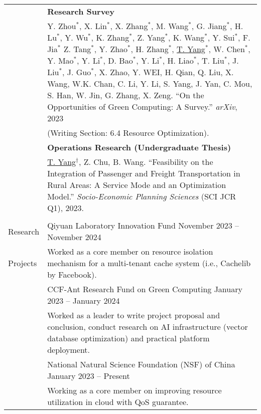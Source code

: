 \documentclass[letterpaper, 10pt]{article}
\begin{document}
\begin{longtable}{p{}p{}}
& \textbf{Research Survey} 
\vspace{0.01\textwidth} \\

& Y. Zhou$^*$, X. Lin$^*$, X. Zhang$^*$, M. Wang$^*$, G. Jiang$^*$, H. Lu$^*$, Y. Wu$^*$, K. Zhang$^*$, Z. Yang$^*$, K. Wang$^*$, Y. Sui$^*$, F. Jia$^*$ Z. Tang$^*$, Y. Zhao$^*$, H. Zhang$^*$, \underline{T. Yang}$^*$, W. Chen$^*$, Y. Mao$^*$, Y. Li$^*$, D. Bao$^*$, Y. Li$^*$, H. Liao$^*$, T. Liu$^*$, J. Liu$^*$, J. Guo$^*$, X. Zhao, Y. WEI, H. Qian, Q. Liu, X. Wang, W.K. Chan, C. Li, Y. Li, S. Yang, J. Yan, C. Mou, S. Han, W. Jin, G. Zhang, X. Zeng. \enquote{On the Opportunities of Green Computing: A Survey.} \textit{arXiv}, 2023 \\
& (Writing Section: 6.4 Resource Optimization). 
\vspace{0.01\textwidth} \\

& \textbf{Operations Research (Undergraduate Thesis)}
\vspace{0.01\textwidth} \\

& \underline{T. Yang}$^\dagger$, Z. Chu, B. Wang. \enquote{Feasibility on the Integration of Passenger and Freight Transportation in Rural Areas: A Service Mode and an Optimization Model.} \textit{Socio-Economic Planning Sciences} (SCI JCR Q1), 2023. \\
& \\


\nohyphens{\textcolor{OliveGreen}{Research}}
& {Qiyuan Laboratory Innovation Fund} \hfill  November 2023 -- November 2024 \\
\nohyphens{\textcolor{OliveGreen}{Projects}}
& Worked as a core member on resource isolation mechanism for a multi-tenant cache system (i.e., Cachelib by Facebook).
\vspace{0.01\textwidth} \\

& {CCF-Ant Research Fund on Green Computing} \hfill January 2023 -- January 2024 \\
& Worked as a leader to write project proposal and conclusion, conduct research on AI infrastructure (vector database optimization) and practical platform deployment.
\vspace{0.01\textwidth} \\

& {National Natural Science Foundation (NSF) of China} \hfill January 2023 -- Present \\
& Working as a core member on improving resource utilization in cloud with QoS guarantee. \vspace{0.01\textwidth} \\


\end{longtable}
\end{document}
